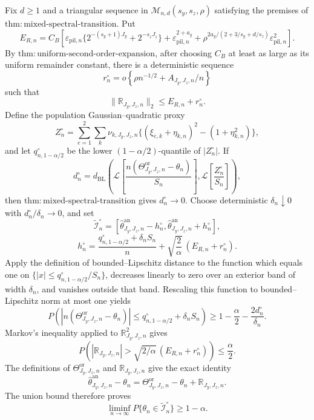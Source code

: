 Fix \(d\ge1\) and a triangular sequence in \(\mathcal M_{n,d}(s_y,s_z,\rho)\) satisfying the premises of \(\mathrm{thm{:}mixed\text{-}spectral\text{-}transition}\).  Put
\[
E_{R,n}=C_B\left[
\varepsilon_{\mathrm{pil},n}\{2^{-(s_y+1)J_y}+2^{-s_zJ_z}\}
+\varepsilon_{\mathrm{pil},n}^{2+a_y}
+\rho^{2a_y/(2+3/s_y+d/s_z)}\varepsilon_{\mathrm{pil},n}^2
\right].
\]
By \(\mathrm{thm{:}uniform\text{-}second\text{-}order\text{-}expansion}\), after choosing \(C_B\) at least as large as its uniform remainder constant, there is a deterministic sequence
\[
r_n^\circ=o\!\left\{\rho n^{-1/2}+A_{J_y,J_z,n}/n\right\}
\]
such that
\[
\|\mathbb R_{J_y,J_z,n}\|_2\le E_{R,n}+r_n^\circ.
\]
Define the population Gaussian--quadratic proxy
\[
Z_n^\circ=\sum_{e=1}^2\sum_k\nu_{k,J_y,J_z,n}
\{(\xi_{e,k}+\eta_{k,n})^2-(1+\eta_{k,n}^2)\},
\]
and let \(q_{n,1-\alpha/2}^\circ\) be the lower \((1-\alpha/2)\)-quantile of \(|Z_n^\circ|\).  If
\[
d_n^\circ=d_{\mathrm{BL}}\!\left(
\mathcal L\!\left[\frac{n(\Theta^{\mathrm{or}}_{J_y,J_z,n}-\theta_n)}{S_n}\right],
\mathcal L\!\left[\frac{Z_n^\circ}{S_n}\right]\right),
\]
then \(\mathrm{thm{:}mixed\text{-}spectral\text{-}transition}\) gives \(d_n^\circ\to0\).  Choose deterministic \(\delta_n\downarrow0\) with \(d_n^\circ/\delta_n\to0\), and set
\[
\widetilde{\mathcal I}_n^\circ=
\left[\widehat\theta^{\mathrm{an}}_{J_y,J_z,n}-h_n^\circ,
\widehat\theta^{\mathrm{an}}_{J_y,J_z,n}+h_n^\circ\right],
\]
\[
h_n^\circ=\frac{q_{n,1-\alpha/2}^\circ+\delta_nS_n}{n}
+\sqrt{\frac{2}{\alpha}}\,(E_{R,n}+r_n^\circ).
\]
Apply the definition of bounded--Lipschitz distance to the function which equals one on
\(\{|x|\le q_{n,1-\alpha/2}^\circ/S_n\}\), decreases linearly to zero over an exterior band of width \(\delta_n\), and vanishes outside that band.  Rescaling this function to bounded--Lipschitz norm at most one yields
\[
P\!\left(\left|n(\Theta^{\mathrm{or}}_{J_y,J_z,n}-\theta_n)\right|
\le q_{n,1-\alpha/2}^\circ+\delta_nS_n\right)
\ge1-\frac{\alpha}{2}-\frac{2d_n^\circ}{\delta_n}.
\]
Markov's inequality applied to \(\mathbb R_{J_y,J_z,n}^2\) gives
\[
P\!\left(
|\mathbb R_{J_y,J_z,n}|>
\sqrt{2/\alpha}\,(E_{R,n}+r_n^\circ)\right)\le\frac{\alpha}{2}.
\]
The definitions of \(\Theta^{\mathrm{or}}_{J_y,J_z,n}\) and
\(\mathbb R_{J_y,J_z,n}\) give the exact identity
\[
\widehat\theta^{\mathrm{an}}_{J_y,J_z,n}-\theta_n
=\Theta^{\mathrm{or}}_{J_y,J_z,n}-\theta_n
+\mathbb R_{J_y,J_z,n}.
\]
The union bound therefore proves
\[
\liminf_{n\to\infty}P\{\theta_n\in\widetilde{\mathcal I}_n^\circ\}
\ge1-\alpha.
\]

